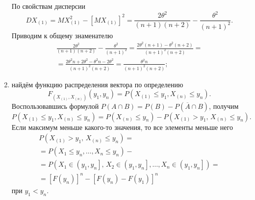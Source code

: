 \begin{enumerate}[label=\alph*)]
По свойствам дисперсии
$$DX_{ \left( 1 \right) } =
  MX_{ \left( 1 \right) }^2 - \left[ MX_{ \left( 1 \right) } \right]^2 =
  \frac{2 \theta^2}{ \left( n + 1 \right) \left( n + 2 \right) } -
  \frac{ \theta^2}{ \left( n + 1 \right)^2}.$$
Приводим к общему знаменателю
\begin{equation*}
  \begin{split}
    \frac{2 \theta^2}{ \left( n + 1 \right) \left( n + 2 \right) } -
    \frac{ \theta^2}{ \left( n + 1 \right)^2} =
    \frac{2 \theta^2 \left( n + 1 \right) - \theta^2 \left( n + 2 \right) }{ \left( n + 1 \right)^2 \left( n + 2 \right) } = \\
    = \frac{2 \theta^2 n + 2 \theta^2 - \theta^2 n - 2 \theta^2}{ \left( n + 1 \right)^2 \left( n + 2 \right) } =
    \frac{ \theta^2 n}{ \left( n + 1 \right)^2 \left( n + 2 \right) };
  \end{split}
\end{equation*}
\item найдём функцию распределения вектора по определению
$$F_{ \left( X_{ \left( 1 \right)}, X_{ \left( n \right) } \right) } \left( y_1, y_n \right)=
  P \left( X_{ \left( 1 \right) } \leq y_1, X_{ \left( n \right) } \leq y_n \right).$$
Воспользовавшись формулой
$P \left( A \cap B \right) =
  P \left( B \right) - P \left( \overline{A} \cap B \right) $,
получим
$$P \left( X_{ \left( 1 \right) } \leq y_1, X_{ \left( n \right) } \leq y_n \right) =
    P \left( X_{ \left( n \right) } \leq y_n \right) -
    P \left( X_{ \left( 1 \right) } > y_1, \, X_{ \left( n \right) } \leq y_n \right).$$
Если максимум меньше какого-то значения, то все элементы меньше него
\begin{equation*}
  \begin{split}
    P \left( X_{ \left( 1 \right) } > y_1, \, X_{ \left( n \right) } \leq y_n \right) = \\
    = P \left( X_1 \leq y_n, \dotsc, X_n \leq y_n \right) - \\
    = P \left(
      X_1 \in \left( y_1, y_n \right], \,
      X_2 \in \left( y_1, y_n \right],
      \dotsc,
      X_n \in \left( y_1, y_n \right]
    \right) = \\
    = \left[ F \left( y_n \right) \right]^n -
    \left[ F \left( y_n \right) - F \left( y_1 \right) \right]^n
  \end{split}
\end{equation*}
при $y_1 < y_n$.


\end{enumerate}
